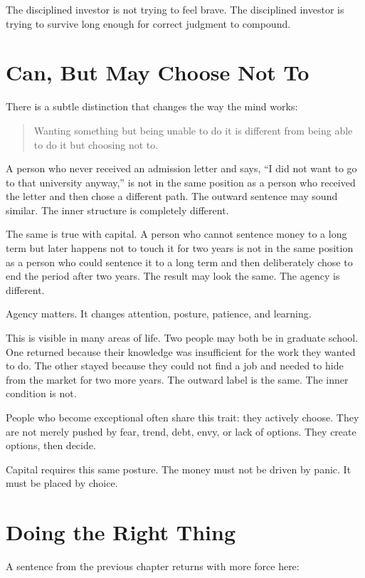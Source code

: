 The disciplined investor is not trying to feel brave. The disciplined investor is trying to survive long enough for correct judgment to compound.

\section*{Can, But May Choose Not To}

There is a subtle distinction that changes the way the mind works:

\begin{quote}
Wanting something but being unable to do it is different from being able to do it but choosing not to.
\end{quote}

A person who never received an admission letter and says, ``I did not want to go to that university anyway,'' is not in the same position as a person who received the letter and then chose a different path. The outward sentence may sound similar. The inner structure is completely different.

The same is true with capital. A person who cannot sentence money to a long term but later happens not to touch it for two years is not in the same position as a person who could sentence it to a long term and then deliberately chose to end the period after two years. The result may look the same. The agency is different.

Agency matters. It changes attention, posture, patience, and learning.

This is visible in many areas of life. Two people may both be in graduate school. One returned because their knowledge was insufficient for the work they wanted to do. The other stayed because they could not find a job and needed to hide from the market for two more years. The outward label is the same. The inner condition is not.

People who become exceptional often share this trait: they actively choose. They are not merely pushed by fear, trend, debt, envy, or lack of options. They create options, then decide.

Capital requires this same posture. The money must not be driven by panic. It must be placed by choice.

\section*{Doing the Right Thing}

A sentence from the previous chapter returns with more force here:

